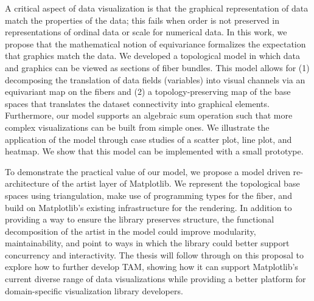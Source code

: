  A critical aspect of data visualization is that the graphical representation of data match the properties of the data; this fails when order is not preserved in representations of ordinal data or scale for numerical data. In this work, we propose that the mathematical notion of equivariance formalizes the expectation that graphics match the data. We developed a topological model in which data and graphics can be viewed as sections of fiber bundles. This model allows for (1) decomposing the translation of data fields (variables) into visual channels via an equivariant map on the fibers and (2) a topology-preserving map of the base spaces that translates the dataset connectivity into graphical elements. Furthermore, our model supports an algebraic sum operation such that more complex visualizations can be built from simple ones. We illustrate the application of the model through case studies of a scatter plot, line plot, and heatmap. We show that this model can be implemented with a small prototype.

 To demonstrate the practical value of our model, we propose a model driven re-architecture of the artist layer of Matplotlib. We represent the topological base spaces using triangulation, make use of programming types for the fiber, and build on Matplotlib's existing infrastructure for the rendering. In addition to providing a way to ensure the library preserves structure, the functional decomposition of the artist in the model could improve modularity, maintainability, and point to ways in which the library could better support concurrency and interactivity. The thesis will follow through on this proposal to explore how to further develop TAM, showing how it can support Matplotlib's current diverse range of data visualizations while providing a better platform for domain-specific visualization library developers.
